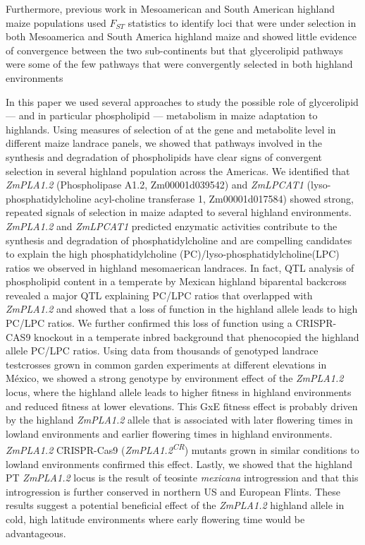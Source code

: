 \documentclass[9pt,twocolumn,twoside,lineno]{BioRxiv}
\begin{document}
Furthermore, previous work in Mesoamerican and South American highland maize populations used $F_{ST}$ statistics to identify loci that were under selection in both Mesoamerica and South America highland maize and showed little evidence of convergence between the two sub-continents but that glycerolipid pathways were some of the few pathways that were convergently selected in both highland environments  \cite{Takuno2015-uj}

In this paper we used several approaches to study the possible role of glycerolipid --- and in particular phospholipid --- metabolism in maize adaptation to highlands. 
Using measures of selection of at the gene and metabolite level in different maize landrace panels, we showed that pathways involved in the synthesis and degradation of phospholipids have clear signs of convergent selection in several highland population across the Americas. 
We identified that \textit{ZmPLA1.2} (Phospholipase A1.2, Zm00001d039542) and \textit{ZmLPCAT1} (lyso-phosphatidylcholine acyl-choline transferase 1, Zm00001d017584) showed strong, repeated signals of selection in maize adapted to several highland environments. 
\textit{ZmPLA1.2} and \textit{ZmLPCAT1} predicted enzymatic activities contribute to the synthesis and degradation of phosphatidylcholine and are compelling candidates to explain the high phosphatidylcholine (PC)/lyso-phosphatidylcholine(LPC) ratios we observed in highland mesomaerican landraces. 
In fact, QTL analysis of phospholipid content in a temperate by Mexican highland biparental backcross revealed a major QTL explaining PC/LPC ratios that overlapped with \textit{ZmPLA1.2} and showed that a loss of function in the highland allele leads to high PC/LPC ratios. 
We further confirmed this loss of function using a CRISPR-CAS9 knockout in a temperate inbred background that phenocopied the highland allele PC/LPC ratios. 
Using data from thousands of genotyped landrace testcrosses grown in common garden experiments at different elevations in México, we showed a strong genotype by environment effect of the \textit{ZmPLA1.2} locus, 
where the highland allele leads to higher fitness in highland environments and reduced fitness at lower elevations. 
This GxE fitness effect is probably driven by the highland \textit{ZmPLA1.2} allele that is associated with later flowering times in lowland environments and earlier flowering times in highland environments. 
\textit{ZmPLA1.2} CRISPR-Cas9 (\textit{ZmPLA1.2\textsuperscript{CR}}) mutants grown in similar conditions to lowland environments confirmed this effect.
Lastly, we showed that the highland PT \textit{ZmPLA1.2} locus is the result of teosinte \textit{mexicana} introgression and that this introgression is further conserved in northern US and European Flints. 
These results suggest a potential beneficial effect of the \textit{ZmPLA1.2} highland allele in cold, high latitude environments where early flowering time would be advantageous.
\end{document}
